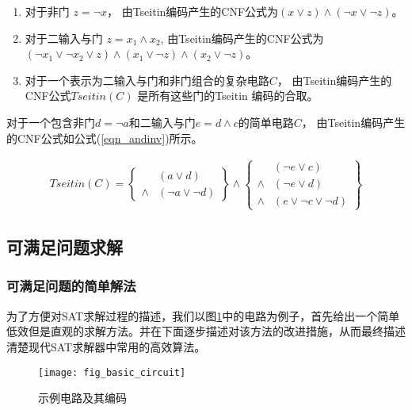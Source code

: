 \begin{enumerate}
\item 对于非门 $z=\neg x$，
由Tseitin编码产生的CNF公式为$(x\vee z)\wedge( \neg x\vee \neg z)$。
\item 对于二输入与门 $z=x_1\wedge x_2$,
由Tseitin编码产生的CNF公式为$( \neg x_1\vee \neg x_2\vee z)\wedge(x_1\vee \neg z) \wedge(x_2\vee \neg z)$。
\item 对于一个表示为二输入与门和非门组合的复杂电路$C$，
由Tseitin编码产生的CNF公式$Tseitin(C)$ 是所有这些门的Tseitin 编码的合取。
\end{enumerate}

对于一个包含非门$d=\neg a$和二输入与门$e=d\wedge c$的简单电路$C$，
由Tseitin编码产生的CNF公式如公式(\ref{eqn_andinv})所示。


\begin{multline}\label{eqn_andinv}
Tseitin(C)=
\left\{
\begin{array}{cc}
& (a\vee d) \\
\wedge & (\neg a\vee \neg d)
\end{array}
\right\}\wedge\left\{
\begin{array}{cc}
& (\neg e\vee c) \\
\wedge & (\neg e\vee d) \\
\wedge & (e\vee \neg c\vee\neg d)
\end{array}
\right\}
\end{multline}


\subsection{可满足问题求解}

\subsubsection{可满足问题的简单解法}
为了方便对SAT求解过程的描述，我们以图\ref{basic_circuit}中的电路为例子，首先给出一个简单低效但是直观的求解方法。并在下面逐步描述对该方法的改进措施，从而最终描述清楚现代SAT求解器中常用的高效算法。

\begin{figure}[t] %
  \centering
  \texttt{[image: fig\_basic\_circuit]}
  \caption{示例电路及其编码}
  \label{basic_circuit}
\end{figure}


